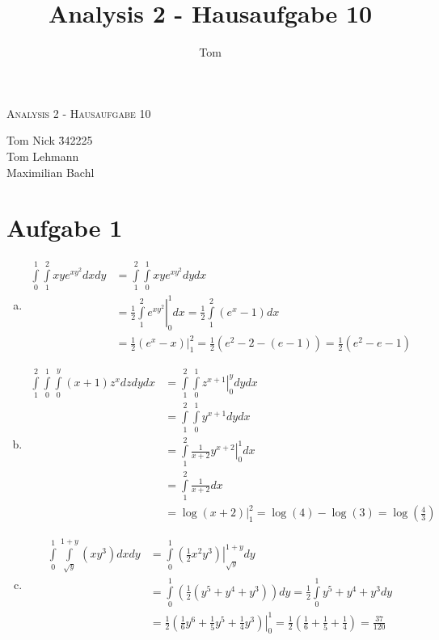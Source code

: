 \documentclass[10pt,a4paper,parskip=half]{scrartcl}
\author{Tom}
\title{Analysis 2 - Hausaufgabe 10}
\begin{document}
\begin{center}
\textsc{\Large{Analysis 2 - Hausaufgabe 10}} \\
\end{center}
\begin{tabbing}
Tom Nick \hspace{1.4cm}\= 342225\\
Tom Lehmann\\
Maximilian Bachl
\end{tabbing}
\section*{Aufgabe 1}
\begin{enumerate}[a)]
   \item 
            \begin{align*}
               \int\limits^{1}_0\int\limits^{2}_{1}xye^{xy^2} dxdy &= \int\limits^{2}_{1}\int\limits^{1}_0xye^{xy^2} dydx \\
               &= \frac 12 \left. \int\limits^{2}_{1} e^{xy^2} \right|^1_0 dx = \frac 12 \int\limits^{2}_{1} (e^x - 1) dx \\
               &= \frac 12 (e^x - x)|^2_1 = \frac 12 (e^2 - 2 - (e - 1)) = \frac 12 (e^2 - e - 1)
            \end{align*}
   \item 
            \begin{align*}
               \int\limits^{2}_{1}\int\limits^1_0\int\limits^y_0(x+1)z^x dzdydx &= \int\limits^{2}_{1}\int\limits^1_0 \left. z^{x+1} \right|^y_0 dydx \\
               &= \int\limits^{2}_{1}\int\limits^1_0 y^{x+1} dydx \\
               &= \int\limits^{2}_{1}\left. \frac 1 {x+2} y^{x+2} \right|^1_0 dx \\
               &= \int\limits^{2}_{1}\frac 1 {x+2} dx \\
               &= \left.\log(x+2)\right|^2_1 = \log(4) - \log(3) = \log\left(\frac 4 3\right)
            \end{align*}
   \item 
            \begin{align*}
               \int\limits^{1}_{0}\int\limits^{1+y}_{\sqrt{y}}(xy^3) dxdy &=   \int\limits^{1}_{0} \left. (\frac 1 2 x^2y^3) \right|^{1+y}_{\sqrt{y}} dy \\
               &=   \int\limits^{1}_{0} (\frac 1 2 (y^5 + y^4 + y^3))  dy = \frac 1 2 \int\limits^{1}_{0} y^5 + y^4 + y^3  dy \\
               &= \left.\frac 1 2\left( \frac 16 y^6 + \frac 15 y^5 + \frac 14 y^3 \right)\right|^1_0 = \frac 12\left( \frac 16 + \frac 15 + \frac 14 \right) = \frac{37}{120}
            \end{align*}
\end{enumerate}
\end{document}
